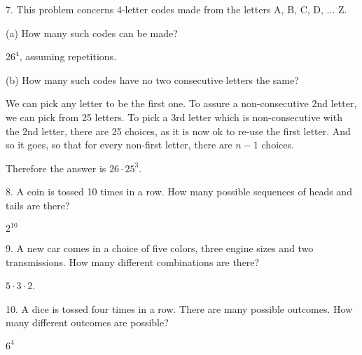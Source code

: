 \documentclass{hippoidC}
\begin{document}
\begin{prooflist}{ 7. This problem concerns 4-letter codes made from the letters
		A, B, C, D, $\ldots$ Z.}
	\item (a) How many such codes can be made?
	\item $26^4$, assuming repetitions.
	\item (b) How many such codes have no two consecutive letters the same?
	\item We can pick any letter to be the first one. To assure a non-consecutive
	2nd letter, we can pick from 25 letters.  To pick a 3rd letter which is
	non-consecutive with the 2nd letter, there are 25 choices, as it is now ok
	to re-use the first letter. And so it goes, so that for every non-first
	letter, there are $n-1$ choices.
	\item Therefore the answer is $26\cdot 25^3$.
\end{prooflist}

\begin{prooflist}{8. A coin is tossed 10 times in a row. How many possible
		sequences of heads and tails are there? }
	\item $2^{10}$
\end{prooflist}

\begin{prooflist} {9. A new car comes in a choice of five colors, three engine
		sizes and two transmissions. How many different combinations are there?}
	\item $5 \cdot 3 \cdot 2$.
\end{prooflist}

\begin{prooflist}{ 10. A dice is tossed four times in a row. There are many
		possible outcomes. How many different outcomes are possible?}
	\item $ 6^4$
\end{prooflist}
\end{document}
